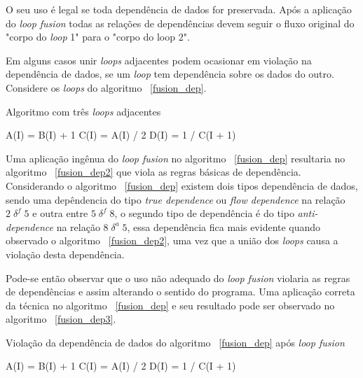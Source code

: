 O seu uso é legal se toda dependência de dados for preservada. 
Após a aplicação do \textit{loop fusion} todas as relações de dependências devem 
seguir o fluxo original do "corpo do \textit{loop} 1" para o "corpo do loop
2".

Em alguns casos unir \textit{loops} adjacentes podem ocasionar em violação na
dependência de dados, se um \textit{loop} tem dependência sobre os dados do
outro. Considere os \textit{loops} do algoritmo ~\ref{fusion_dep}.

\begin{algorithm}
\caption{Algoritmo com três \textit{loops} adjacentes}
\label{fusion_dep}
\begin{algorithmic}[1]

\STATE A(I) = B(I) + 1
\ENDFOR
{}
\STATE C(I) = A(I) / 2
\ENDFOR
{}
\STATE D(I) = 1 / C(I + 1)
\ENDFOR

\end{algorithmic}
\end{algorithm}

Uma aplicação ingênua do \textit{loop fusion} no algoritmo ~\ref{fusion_dep} 
resultaria no algoritmo ~\ref{fusion_dep2} que viola as regras básicas de 
dependência.
Considerando o algoritmo ~\ref{fusion_dep} existem dois tipos dependência 
de dados, sendo uma depêndencia do tipo \textit{true dependence} ou 
\textit{flow dependence} na relação $2 \; \delta^f \; 5$ e outra entre 
$5 \; \delta^f \; 8$, o segundo tipo de dependência é do tipo
\textit{anti-dependence} na relação $8 \; \delta^a \; 5$, essa dependência
fica mais evidente quando observado o algoritmo ~\ref{fusion_dep2}, 
uma vez que a união dos \textit{loops} causa a violação desta dependência. 

Pode-se então observar que o uso não adequado do \textit{loop fusion} violaria
as regras de dependências e assim alterando o sentido do programa. 
Uma aplicação correta da técnica no algoritmo ~\ref{fusion_dep} e seu 
resultado pode ser observado no algoritmo ~\ref{fusion_dep3}.

\begin{algorithm}
\caption{Violação da dependência de dados do algoritmo ~\ref{fusion_dep} após
        \textit{loop fusion}}
\label{fusion_dep2}
\begin{algorithmic}[1]

\STATE A(I) = B(I) + 1
\STATE C(I) = A(I) / 2
\STATE D(I) = 1 / C(I + 1)
\ENDFOR

\end{algorithmic}
\end{algorithm}


